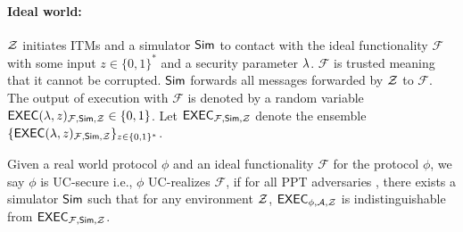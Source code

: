 \paragraph{Ideal world:} $ \mathcal{Z} $ initiates ITMs and a simulator $ \mathsf{Sim} $ to contact with the ideal functionality $ \mathcal{F} $ with some input $ z \in \{0,1\}^* $  and a security parameter $ \lambda $. $ \mathcal{F} $ is trusted meaning that it cannot be corrupted.
$ \mathsf{Sim} $ forwards all messages forwarded by $ \mathcal{Z} $ to $ \mathcal{F} $. The output of execution with $ \mathcal{F} $ is denoted by a random variable $ \mathsf{EXEC}(\lambda, z)_{\mathcal{F},\mathsf{Sim}, \mathcal{Z}} \in \{0,1\}$.  Let $ \mathsf{EXEC}_{\mathcal{F},\mathsf{Sim}, \mathcal{Z}} $ denote the ensemble $ \{\mathsf{EXEC}(\lambda, z)_{\mathcal{F}, \mathsf{Sim}, \mathcal{Z}} \}_{z \in \{0,1\}^*} $.


\begin{definition} \label{def:uc}
	Given a real world protocol $ \phi $ and an ideal functionality $ \mathcal{F} $ for the protocol $ \phi $, we say $ \phi $ is UC-secure i.e., $ \phi $ UC-realizes $ \mathcal{F} $, if for all PPT adversaries \adv,  there exists a simulator $ \mathsf{Sim}  $ such that for any environment $ \mathcal{Z} $,
	$\mathsf{EXEC}_{\phi, \mathcal{A}, \mathcal{Z}}$ is indistinguishable from $\mathsf{EXEC}_{\mathcal{F},\mathsf{Sim}, \mathcal{Z}}$.
\end{definition}





